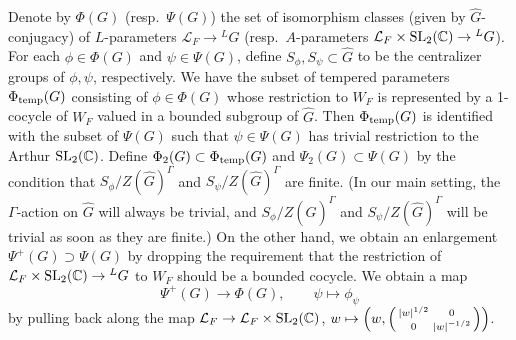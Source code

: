 \documentclass[11pt,reqno]{amsart}
\theoremstyle{plain}
\theoremstyle{definition}
\newcommand{\C}{\mathbb{C}}
\newcommand{\SL}{\tu{SL}}
\newcommand{\tu}{\textup}
\renewcommand{\hat}{\widehat}
\numberwithin{equation}{subsection}
\begin{document}
Denote by $\Phi(G)$ (resp.~$\Psi(G)$) the set of isomorphism classes (given by $\hat G$-conjugacy) of $L$-parameters $\mathcal L_F\to {}^L G$ (resp.~$A$-parameters $\mathcal L_F\times \SL_2(\C)\to {}^L G$). For each $\phi\in \Phi(G)$ and $\psi\in \Psi(G)$, define $S_\phi,S_\psi\subset \hat G$ to be the centralizer groups of $\phi,\psi$, respectively.
We have the subset of tempered parameters $\Phi_{\tu{temp}}(G)$ consisting of $\phi\in \Phi(G)$ whose restriction to $W_F$ is represented by a 1-cocycle of $W_F$ valued in a bounded subgroup of $\hat G$. Then $\Phi_{\tu{temp}}(G)$ is identified with the subset of $\Psi(G)$ such that $\psi\in\Psi(G)$ has trivial restriction to the Arthur $\SL_2(\C)$. Define $\Phi_2(G)\subset \Phi_{\tu{temp}}(G)$ and $\Psi_2(G)\subset \Psi(G)$ by the condition that $S_\phi/Z(\hat G)^{\Gamma}$ and $S_\psi/Z(\hat G)^{\Gamma}$ are finite. (In our main setting, the $\Gamma$-action on $\hat G$ will always be trivial, and $S_\phi/Z(\hat G)^{\Gamma}$ and $S_\psi/Z(\hat G)^{\Gamma}$ will be trivial as soon as they are finite.) 
On the other hand, we obtain an enlargement $\Psi^+(G)\supset \Psi(G)$ by dropping the requirement that the restriction of $\mathcal L_F\times \SL_2(\C)\to {}^L G$ to $W_F$ should be a bounded cocycle. We obtain a map
\[
\Psi^+(G)\to \Phi(G),\qquad \psi\mapsto \phi_\psi
\]
by pulling back along the map $\mathcal L_F\to \mathcal L_F\times \SL_2(\C)$, $w\mapsto \left(w,\begin{psmallmatrix}
    |w|^{1/2} & 0\\ 0 & |w|^{-1/2}
\end{psmallmatrix}\right)$.
\end{document}
